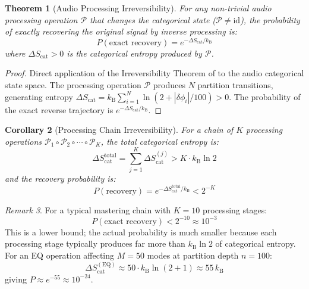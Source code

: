 \documentclass[twocolumn,10pt]{article}
\newtheorem{theorem}{Theorem}[section]
\newtheorem{corollary}[theorem]{Corollary}
\theoremstyle{remark}
\newtheorem{remark}[theorem]{Remark}
\newcommand{\kB}{k_{\mathrm{B}}}
\newcommand{\Scat}{S_{\mathrm{cat}}}
\newcommand{\calP}{\mathcal{P}}
\begin{document}
\begin{theorem}[Audio Processing Irreversibility]
\label{thm:audio_irreversibility}
For any non-trivial audio processing operation $\calP$ that changes the categorical state ($\calP \neq \mathrm{id}$), the probability of exactly recovering the original signal by inverse processing is:
\begin{equation}
    P(\text{exact recovery}) = e^{-\Delta\Scat/\kB}
    \label{eq:audio_irreversibility}
\end{equation}
where $\Delta\Scat > 0$ is the categorical entropy produced by $\calP$.
\end{theorem}

\begin{proof}
Direct application of the Irreversibility Theorem of \cite{sachikonye2026thermodynamics} to the audio categorical state space. The processing operation $\calP$ produces $N$ partition transitions, generating entropy $\Delta\Scat = \kB \sum_{i=1}^{N} \ln(2 + |\delta\phi_i|/100) > 0$. The probability of the exact reverse trajectory is $e^{-\Delta\Scat/\kB}$.
\end{proof}

\begin{corollary}[Processing Chain Irreversibility]
\label{cor:chain_irreversibility}
For a chain of $K$ processing operations $\calP_1 \circ \calP_2 \circ \cdots \circ \calP_K$, the total categorical entropy is:
\begin{equation}
    \Delta\Scat^{\mathrm{total}} = \sum_{j=1}^{K} \Delta\Scat^{(j)} > K \cdot \kB \ln 2
    \label{eq:chain_entropy}
\end{equation}
and the recovery probability is:
\begin{equation}
    P(\text{recovery}) = e^{-\Delta\Scat^{\mathrm{total}}/\kB} < 2^{-K}
    \label{eq:chain_recovery}
\end{equation}
\end{corollary}

\begin{remark}
For a typical mastering chain with $K = 10$ processing stages:
\begin{equation}
    P(\text{exact recovery}) < 2^{-10} \approx 10^{-3}
\end{equation}
This is a lower bound; the actual probability is much smaller because each processing stage typically produces far more than $\kB \ln 2$ of categorical entropy. For an EQ operation affecting $M = 50$ modes at partition depth $n = 100$:
\begin{equation}
    \Delta\Scat^{(\mathrm{EQ})} \approx 50 \cdot \kB \ln(2 + 1) \approx 55 \, \kB
\end{equation}
giving $P \approx e^{-55} \approx 10^{-24}$.
\end{remark}
\end{document}
